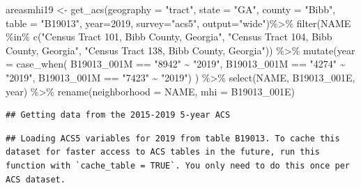 \documentclass[
]{article}
\newenvironment{Shaded}{\begin{snugshade}}{\end{snugshade}}
\newcommand{\AttributeTok}[1]{\textcolor[rgb]{0.77,0.63,0.00}{#1}}
\newcommand{\DecValTok}[1]{\textcolor[rgb]{0.00,0.00,0.81}{#1}}
\newcommand{\FunctionTok}[1]{\textcolor[rgb]{0.00,0.00,0.00}{#1}}
\newcommand{\NormalTok}[1]{#1}
\newcommand{\OtherTok}[1]{\textcolor[rgb]{0.56,0.35,0.01}{#1}}
\newcommand{\SpecialCharTok}[1]{\textcolor[rgb]{0.00,0.00,0.00}{#1}}
\newcommand{\StringTok}[1]{\textcolor[rgb]{0.31,0.60,0.02}{#1}}
\begin{document}
\begin{Shaded}
\begin{Highlighting}[]
\NormalTok{areasmhi19 }\OtherTok{\textless{}{-}} \FunctionTok{get\_acs}\NormalTok{(}\AttributeTok{geography =} \StringTok{"tract"}\NormalTok{, }\AttributeTok{state =} \StringTok{"GA"}\NormalTok{, }\AttributeTok{county =} \StringTok{"Bibb"}\NormalTok{, }\AttributeTok{table =} \StringTok{"B19013"}\NormalTok{, }\AttributeTok{year=}\DecValTok{2019}\NormalTok{, }\AttributeTok{survey=}\StringTok{"acs5"}\NormalTok{, }\AttributeTok{output=}\StringTok{"wide"}\NormalTok{)}\SpecialCharTok{\%\textgreater{}\%}
\FunctionTok{filter}\NormalTok{(NAME }\SpecialCharTok{\%in\%} \FunctionTok{c}\NormalTok{(}\StringTok{"Census Tract 101, Bibb County, Georgia"}\NormalTok{, }\StringTok{"Census Tract 104, Bibb County, Georgia"}\NormalTok{, }\StringTok{"Census Tract 138, Bibb County, Georgia"}\NormalTok{)) }\SpecialCharTok{\%\textgreater{}\%}
\FunctionTok{mutate}\NormalTok{(}\AttributeTok{year =} \FunctionTok{case\_when}\NormalTok{(}
\NormalTok{  B19013\_001M }\SpecialCharTok{==} \StringTok{"8942"} \SpecialCharTok{\textasciitilde{}} \StringTok{"2019"}\NormalTok{,}
\NormalTok{  B19013\_001M }\SpecialCharTok{==} \StringTok{"4274"} \SpecialCharTok{\textasciitilde{}} \StringTok{"2019"}\NormalTok{,}
\NormalTok{  B19013\_001M }\SpecialCharTok{==} \StringTok{"7423"} \SpecialCharTok{\textasciitilde{}} \StringTok{"2019"}\NormalTok{) ) }\SpecialCharTok{\%\textgreater{}\%}
\FunctionTok{select}\NormalTok{(NAME, B19013\_001E, year) }\SpecialCharTok{\%\textgreater{}\%}
\FunctionTok{rename}\NormalTok{(}\AttributeTok{neighborhood =}\NormalTok{ NAME, }\AttributeTok{mhi =}\NormalTok{ B19013\_001E) }
\end{Highlighting}
\end{Shaded}

\begin{verbatim}
## Getting data from the 2015-2019 5-year ACS
\end{verbatim}

\begin{verbatim}
## Loading ACS5 variables for 2019 from table B19013. To cache this dataset for faster access to ACS tables in the future, run this function with `cache_table = TRUE`. You only need to do this once per ACS dataset.
\end{verbatim}
\end{document}
